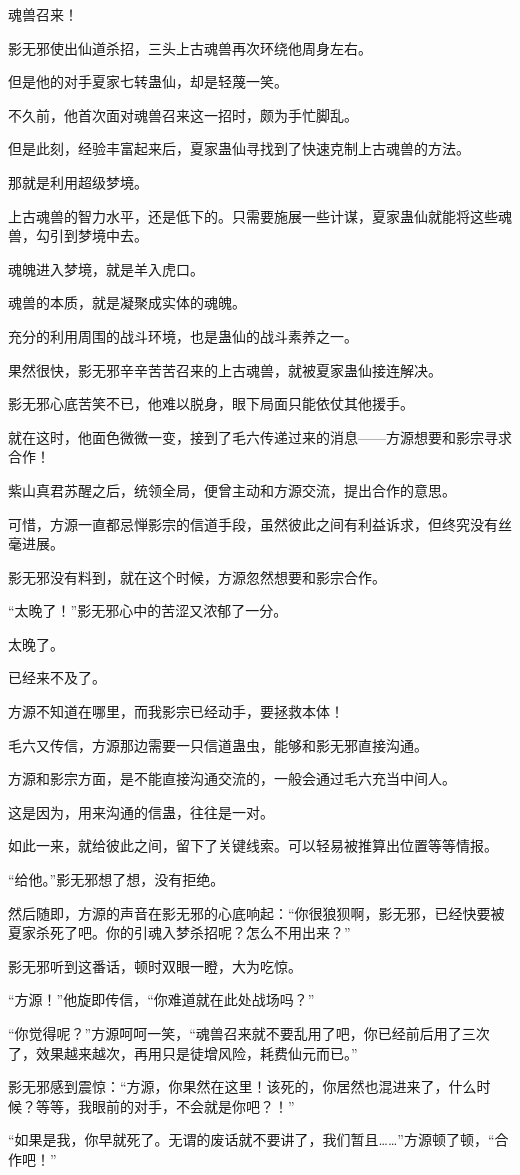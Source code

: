 \begin{this_body}
魂兽召来！

影无邪使出仙道杀招，三头上古魂兽再次环绕他周身左右。

但是他的对手夏家七转蛊仙，却是轻蔑一笑。

不久前，他首次面对魂兽召来这一招时，颇为手忙脚乱。

但是此刻，经验丰富起来后，夏家蛊仙寻找到了快速克制上古魂兽的方法。

那就是利用超级梦境。

上古魂兽的智力水平，还是低下的。只需要施展一些计谋，夏家蛊仙就能将这些魂兽，勾引到梦境中去。

魂魄进入梦境，就是羊入虎口。

魂兽的本质，就是凝聚成实体的魂魄。

充分的利用周围的战斗环境，也是蛊仙的战斗素养之一。

果然很快，影无邪辛辛苦苦召来的上古魂兽，就被夏家蛊仙接连解决。

影无邪心底苦笑不已，他难以脱身，眼下局面只能依仗其他援手。

就在这时，他面色微微一变，接到了毛六传递过来的消息——方源想要和影宗寻求合作！

紫山真君苏醒之后，统领全局，便曾主动和方源交流，提出合作的意思。

可惜，方源一直都忌惮影宗的信道手段，虽然彼此之间有利益诉求，但终究没有丝毫进展。

影无邪没有料到，就在这个时候，方源忽然想要和影宗合作。

“太晚了！”影无邪心中的苦涩又浓郁了一分。

太晚了。

已经来不及了。

方源不知道在哪里，而我影宗已经动手，要拯救本体！

毛六又传信，方源那边需要一只信道蛊虫，能够和影无邪直接沟通。

方源和影宗方面，是不能直接沟通交流的，一般会通过毛六充当中间人。

这是因为，用来沟通的信蛊，往往是一对。

如此一来，就给彼此之间，留下了关键线索。可以轻易被推算出位置等等情报。

“给他。”影无邪想了想，没有拒绝。

然后随即，方源的声音在影无邪的心底响起：“你很狼狈啊，影无邪，已经快要被夏家杀死了吧。你的引魂入梦杀招呢？怎么不用出来？”

影无邪听到这番话，顿时双眼一瞪，大为吃惊。

“方源！”他旋即传信，“你难道就在此处战场吗？”

“你觉得呢？”方源呵呵一笑，“魂兽召来就不要乱用了吧，你已经前后用了三次了，效果越来越次，再用只是徒增风险，耗费仙元而已。”

影无邪感到震惊：“方源，你果然在这里！该死的，你居然也混进来了，什么时候？等等，我眼前的对手，不会就是你吧？！”

“如果是我，你早就死了。无谓的废话就不要讲了，我们暂且……”方源顿了顿，“合作吧！”

\end{this_body}

